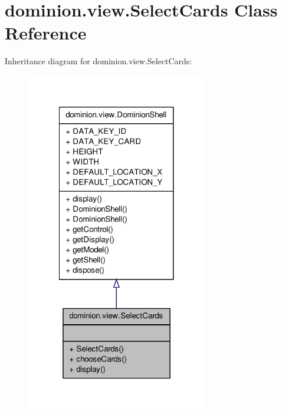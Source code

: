 \hypertarget{classdominion_1_1view_1_1SelectCards}{\section{dominion.\-view.\-Select\-Cards \-Class \-Reference}
\label{classdominion_1_1view_1_1SelectCards}
}


\-Inheritance diagram for dominion.\-view.\-Select\-Cards\-:
\nopagebreak
\begin{figure}[H]
\begin{center}
\leavevmode
\includegraphics[width=224pt]{classdominion_1_1view_1_1SelectCards__inherit__graph}
\end{center}
\end{figure}


